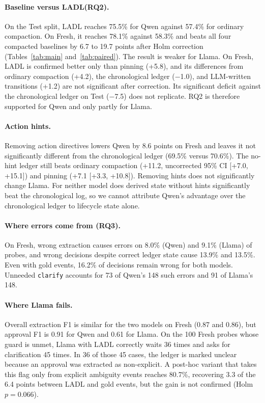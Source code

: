 \documentclass[11pt]{article}
\newcommand{\ours}{\textsc{LADL}\xspace}
\newcommand{\st}[1]{\texttt{#1}}
\begin{document}
\paragraph{Baseline versus \ours (RQ2).} On the Test split, \ours reaches 75.5\% for Qwen against 57.4\% for ordinary compaction. On Fresh, it reaches 78.1\% against 58.3\% and beats all four compacted baselines by 6.7 to 19.7 points after Holm correction (Tables~\ref{tab:main} and~\ref{tab:paired}). The result is weaker for Llama. On Fresh, \ours is confirmed better only than pinning (+5.8), and its differences from ordinary compaction (+4.2), the chronological ledger ($-$1.0), and LLM-written transitions (+1.2) are not significant after correction. Its significant deficit against the chronological ledger on Test ($-$7.5) does not replicate. RQ2 is therefore supported for Qwen and only partly for Llama.

\paragraph{Action hints.} Removing action directives lowers Qwen by 8.6 points on Fresh and leaves it not significantly different from the chronological ledger (69.5\% versus 70.6\%). The no-hint ledger still beats ordinary compaction (+11.2, uncorrected 95\% CI [+7.0, +15.1]) and pinning (+7.1 [+3.3, +10.8]). Removing hints does not significantly change Llama. For neither model does derived state without hints significantly beat the chronological log, so we cannot attribute Qwen's advantage over the chronological ledger to lifecycle state alone.

\paragraph{Where errors come from (RQ3).} On Fresh, wrong extraction causes errors on 8.0\% (Qwen) and 9.1\% (Llama) of probes, and wrong decisions despite correct ledger state cause 13.9\% and 13.5\%. Even with gold events, 16.2\% of decisions remain wrong for both models. Unneeded \st{clarify} accounts for 73 of Qwen's 148 such errors and 91 of Llama's 148.

\paragraph{Where Llama fails.} Overall extraction F1 is similar for the two models on Fresh (0.87 and 0.86), but approval F1 is 0.91 for Qwen and 0.61 for Llama. On the 100 Fresh probes whose guard is unmet, Llama with \ours correctly waits 36 times and asks for clarification 45 times. In 36 of those 45 cases, the ledger is marked unclear because an approval was extracted as non-explicit. A post-hoc variant that takes this flag only from explicit ambiguity events reaches 80.7\%, recovering 3.3 of the 6.4 points between \ours and gold events, but the gain is not confirmed (Holm $p=0.066$).
\end{document}
